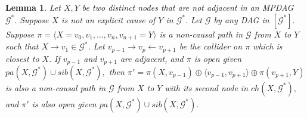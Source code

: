 \documentclass{article}
\newtheorem{lemma}{Lemma}
\begin{document}
\begin{lemma}
\label{lemma:explicit only if noncausal unsheilded}
Let $X,Y$ be two distinct nodes that are not adjacent in an MPDAG $\mathcal{G}^*.$ Suppose $X$ is not an explicit cause of $Y$ in $\mathcal{G}^*.$ Let $\mathcal{G}$ by any DAG in $[\mathcal{G}^*].$ Suppose $\pi=\langle X=v_0,v_1,\dots,v_n,v_{n+1}=Y\rangle$ is a non-causal path in $\mathcal{G}$ from $X$ to $Y$ such that $X\to v_1\in \mathcal{G}^*.$ Let $v_{p-1}\to v_p\leftarrow v_{p+1}$ be the collider on $\pi$ which is closest to $X.$ If $v_{p-1}$ and $v_{p+1}$ are adjacent, and $\pi$ is open given $pa(X,\mathcal{G}^*)\cup sib(X,\mathcal{G}^*),$ then $\pi'=\pi(X,v_{p-1}) \oplus \langle v_{p-1},v_{p+1} \rangle \oplus \pi(v_{p+1},Y)$ is also a non-causal path in $\mathcal{G}$ from $X$ to $Y$ with its second node in $ch(X,\mathcal{G}^*),$ and $\pi'$ is also open given $pa(X,\mathcal{G}^*)\cup sib(X,\mathcal{G}^*).$
\end{lemma}
\end{document}
